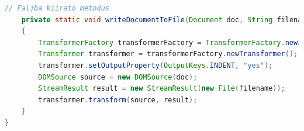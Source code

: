 \documentclass[12pt]{report}
\begin{document}
\begin{lstlisting}[caption={DOMWriteKLNSPG.java} adatíró program, language=Java]
	// Faljba kiirato metodus
	private static void writeDocumentToFile(Document doc, String filename) throws TransformerException 
	{
		TransformerFactory transformerFactory = TransformerFactory.newInstance();
		Transformer transformer = transformerFactory.newTransformer();
		transformer.setOutputProperty(OutputKeys.INDENT, "yes");
		DOMSource source = new DOMSource(doc);
		StreamResult result = new StreamResult(new File(filename));
		transformer.transform(source, result);
	}
}
\end{lstlisting}
\end{document}
